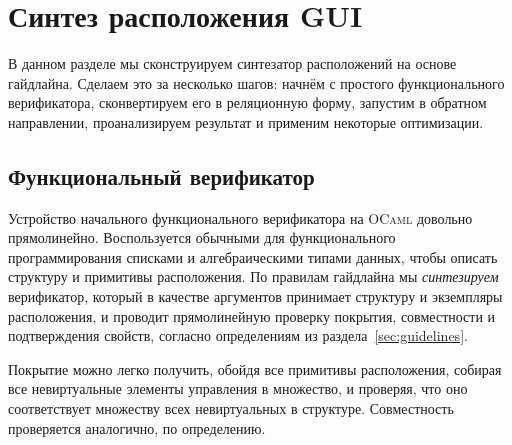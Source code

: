 
\section{Синтез расположения GUI}
\label{sec:synthesizing}

В данном разделе мы сконструируем синтезатор расположений на основе гайдлайна.
Сделаем это за несколько шагов: начнём с простого функционального верификатора, сконвертируем его в реляционную форму,
запустим в обратном направлении, проанализируем результат и применим некоторые оптимизации.


\subsection{Функциональный верификатор}

Устройство начального функционального верификатора на \textsc{OCaml} довольно прямолинейно.
Воспользуется обычными для функционального программирования списками и алгебраическими типами данных, чтобы описать структуру и примитивы расположения.
По правилам гайдлайна мы \emph{синтезируем} верификатор, который в качестве аргументов принимает структуру и экземпляры расположения, и проводит
прямолинейную проверку покрытия, совместности и подтверждения свойств, согласно определениям из раздела~\ref{sec:guidelines}.


Покрытие можно легко получить, обойдя все примитивы расположения, собирая все невиртуальные элементы управления в множество, и
проверяя, что оно соответствует множеству всех невиртуальных в структуре. Совместность проверяется аналогично, по определению.

